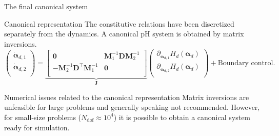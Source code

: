\documentclass[aspectratio=169]{ISAE-Beamer}
\begin{document}
\begin{frame}{The final canonical system}

\begin{exampleblock}{Canonical representation}
The constitutive relations have been discretized separately from the dynamics. A canonical pH system is obtained by matrix inversions. 
\begin{equation*}
\begin{pmatrix}
\dot{\bm{\alpha}}_{d, 1} \\
\dot{\bm{\alpha}}_{d, 2} \\
\end{pmatrix}
= 
\underbrace{
	\begin{bmatrix}
	\mathbf{0} & \mathbf{M}_1^{-1}\mathbf{D}\mathbf{M}_2^{-1} \\
	- \mathbf{M}_2^{-1} \mathbf{D}^\top \mathbf{M}_1^{-1} & \mathbf{0} \\
	\end{bmatrix}}_{\mathbf{J}}
\begin{pmatrix}
\partial_{\bm{\alpha}_{d, 1}} H_d(\bm{\alpha}_d)\\
\partial_{\bm{\alpha}_{d, 2}} H_d(\bm{\alpha}_d)\\
\end{pmatrix}  + 
\text{Boundary control}.
\end{equation*}
\end{exampleblock}
	
	
\begin{alertblock}{Numerical issues related to the canonical representation}
 Matrix inversions are unfeasible for large problems and generally speaking not recommended. However, for small-size problems ($N_{\text{dof}} \approx 10^4$) it is possible to obtain a canonical system ready for simulation.
\end{alertblock}

\end{frame}
\end{document}
